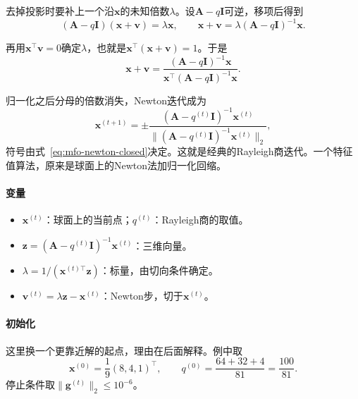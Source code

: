 去掉投影时要补上一个沿$\bm{x}$的未知倍数$\lambda$。设$\bm{A}-q\bm{I}$可逆，移项后得到
\[
 (\bm{A}-q\bm{I})(\bm{x}+\bm{v})=\lambda\bm{x},\qquad
 \bm{x}+\bm{v}=\lambda(\bm{A}-q\bm{I})^{-1}\bm{x}.
\]

再用$\bm{x}^\top\bm{v}=0$确定$\lambda$，也就是$\bm{x}^\top(\bm{x}+\bm{v})=1$。于是
\begin{equation}
 \bm{x}+\bm{v}=\frac{(\bm{A}-q\bm{I})^{-1}\bm{x}}{\bm{x}^\top(\bm{A}-q\bm{I})^{-1}\bm{x}}.
 \label{eq:mfo-newton-closed}
\end{equation}

归一化之后分母的倍数消失，Newton迭代成为
\begin{equation}
 \bm{x}^{(t+1)}=\pm\frac{(\bm{A}-q^{(t)}\bm{I})^{-1}\bm{x}^{(t)}}{\bigl\lVert(\bm{A}-q^{(t)}\bm{I})^{-1}\bm{x}^{(t)}\bigr\rVert_2},
 \label{eq:mfo-rqi}
\end{equation}
符号由式~\eqref{eq:mfo-newton-closed}决定。这就是经典的Rayleigh商迭代。一个特征值算法，原来是球面上的Newton法加归一化回缩。

\paragraph{变量}
\begin{itemize}
 \item $\bm{x}^{(t)}$：球面上的当前点；$q^{(t)}$：Rayleigh商的取值。
 \item $\bm{z}=(\bm{A}-q^{(t)}\bm{I})^{-1}\bm{x}^{(t)}$：三维向量。
 \item $\lambda=1/(\bm{x}^{(t)\top}\bm{z})$：标量，由切向条件确定。
 \item $\bm{v}^{(t)}=\lambda\bm{z}-\bm{x}^{(t)}$：Newton步，切于$\bm{x}^{(t)}$。
\end{itemize}

\paragraph{初始化}
这里换一个更靠近解的起点，理由在后面解释。例中取
\[
 \bm{x}^{(0)}=\frac19(8,4,1)^\top,\qquad q^{(0)}=\frac{64+32+4}{81}=\frac{100}{81}.
\]
停止条件取$\lVert\bm{g}^{(t)}\rVert_2\leq10^{-6}$。


